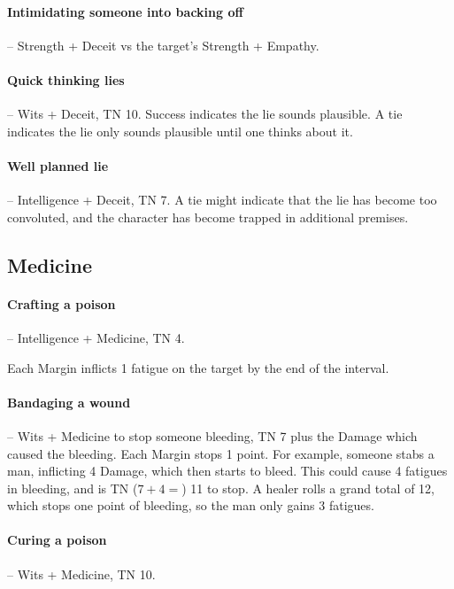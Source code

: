 \begin{multicols}{2}
\paragraph{Intimidating someone into backing off} -- Strength + Deceit vs the target's Strength + Empathy.

\paragraph{Quick thinking lies} -- Wits + Deceit, TN 10.
Success indicates the lie sounds plausible.
A tie indicates the lie only sounds plausible until one thinks about it.

\paragraph{Well planned lie} -- Intelligence + Deceit, TN 7.
A tie might indicate that the lie has become too convoluted, and the character has become trapped in additional premises.

\subsection{Medicine}

\paragraph{Crafting a poison} -- Intelligence + Medicine, TN 4.
\label{poison}

Each Margin inflicts 1 \gls{fatigue} on the target by the end of the interval.

\paragraph{Bandaging a wound} -- Wits + Medicine to stop someone bleeding, TN 7 plus the Damage which caused the bleeding.
Each Margin stops 1 point.
For example, someone stabs a man, inflicting 4 Damage, which then starts to bleed.
This could cause 4 \glspl{fatigue} in bleeding, and is TN ($7 + 4 = $) 11 to stop.
A healer rolls a grand total of 12, which stops one point of bleeding, so the man only gains 3 \glspl{fatigue}.

\paragraph{Curing a poison} -- Wits + Medicine, TN 10.


\end{multicols}

